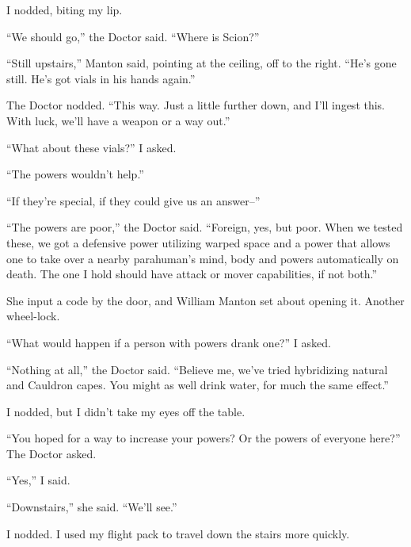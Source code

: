 I nodded, biting my lip.



``We should go,'' the Doctor said.  ``Where is Scion?''



``Still upstairs,'' Manton said, pointing at the ceiling, off to the right.  ``He's gone still.  He's got vials in his hands again.''



The Doctor nodded.  ``This way.  Just a little further down, and I'll ingest this.  With luck, we'll have a weapon or a way out.''



``What about these vials?''  I asked.



``The powers wouldn't help.''



``If they're special, if they could give us an answer--''



``The powers are poor,'' the Doctor said.  ``Foreign, yes, but poor.  When we tested these, we got a defensive power utilizing warped space and a power that allows one to take over a nearby parahuman's mind, body and powers automatically on death.  The one I hold should have attack or mover capabilities, if not both.''



She input a code by the door, and William Manton set about opening it.  Another wheel-lock.



``What would happen if a person with powers drank one?''  I asked.



``Nothing at all,'' the Doctor said.  ``Believe me, we've tried hybridizing natural and Cauldron capes.  You might as well drink water, for much the same effect.''



I nodded, but I didn't take my eyes off the table.



``You hoped for a way to increase your powers?  Or the powers of everyone here?''  The Doctor asked.



``Yes,'' I said.



``Downstairs,'' she said.  ``We'll see.''



I nodded.  I used my flight pack to travel down the stairs more quickly.



